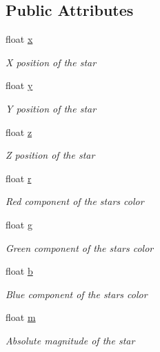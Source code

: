 \subsection*{Public Attributes}
\begin{DoxyCompactItemize}
\item 
float \mbox{\hyperlink{struct_star_a28e9191b275b9a61792f206185c2a852}{x}}
\begin{DoxyCompactList}\small\item\em X position of the star \end{DoxyCompactList}\item 
float \mbox{\hyperlink{struct_star_a5ebda39c55380dcd3586dc32baac647d}{y}}
\begin{DoxyCompactList}\small\item\em Y position of the star \end{DoxyCompactList}\item 
float \mbox{\hyperlink{struct_star_a00716c62574f63e932fb031d3d53a9f6}{z}}
\begin{DoxyCompactList}\small\item\em Z position of the star \end{DoxyCompactList}\item 
float \mbox{\hyperlink{struct_star_a8b93e00f216854cad87ac6f61e04b0f3}{r}}
\begin{DoxyCompactList}\small\item\em Red component of the star\textquotesingle{}s color \end{DoxyCompactList}\item 
float \mbox{\hyperlink{struct_star_ad9034f40a9923febb7596b06258278c8}{g}}
\begin{DoxyCompactList}\small\item\em Green component of the star\textquotesingle{}s color \end{DoxyCompactList}\item 
float \mbox{\hyperlink{struct_star_a3469c5e78552834a63b5d4566ff5bdd7}{b}}
\begin{DoxyCompactList}\small\item\em Blue component of the star\textquotesingle{}s color \end{DoxyCompactList}\item 
float \mbox{\hyperlink{struct_star_a478e590dc67183b8252670b4e51752d7}{m}}
\begin{DoxyCompactList}\small\item\em Absolute magnitude of the star \end{DoxyCompactList}\end{DoxyCompactItemize}
